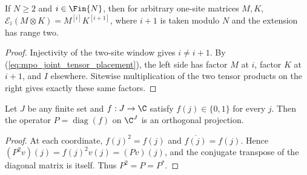 \begin{theorem}
    \label{thm:mpo_joint_two_site_product}
    If $N\geq2$ and $i\in\Fin{N}$, then for arbitrary one-site
    matrices $M,K$,
    $\mathcal E_i(M\otimes K)=M^{[i]}K^{[i+1]}$, where $i+1$ is
    taken modulo $N$ and the extension has range two.
\end{theorem}
\begin{proof}
    Injectivity of the two-site window gives $i\ne i+1$.
    By (\ref{eq:mpo_joint_tensor_placement}), the left side has factor
    $M$ at $i$, factor $K$ at $i+1$, and $I$ elsewhere.
    Sitewise multiplication of the two tensor products on the right
    gives exactly these same factors.
\end{proof}

\begin{theorem}
    \label{thm:mpo_joint_binary_diagonal_projection}
    Let $J$ be any finite set and $f:J\to\C$ satisfy
    $f(j)\in\{0,1\}$ for every $j$. Then the operator
    $P=\operatorname{diag}(f)$ on $\C^J$ is an orthogonal projection.
\end{theorem}
\begin{proof}
    At each coordinate, $f(j)^2=f(j)$ and $\overline{f(j)}=f(j)$.
    Hence $(P^2v)(j)=f(j)^2v(j)=(Pv)(j)$, and the conjugate transpose
    of the diagonal matrix is itself. Thus $P^2=P=P^*$.
\end{proof}
